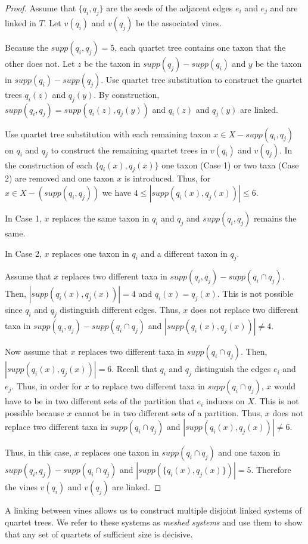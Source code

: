 \documentclass[final,3p,times]{elsarticle}
\theoremstyle{definition}
\theoremstyle{remark}
\begin{document}
\begin{proof}
Assume that $\{q_i,q_j\}$ are the seeds of the adjacent edges $e_i$ and $e_j$ and are linked in $T$. Let $v(q_i)$ and $v(q_j)$ be the associated vines. 

Because the $supp(q_i,q_j)=5$, each quartet tree contains one taxon that the other does not. Let $z$ be the taxon in $supp(q_j)-supp(q_i)$ and $y$ be the taxon in $supp(q_i)-supp(q_j)$. Use quartet tree substitution to construct the quartet trees $q_i(z)$ and $q_j(y)$. By construction, $supp(q_i,q_j)=supp(q_i(z),q_j(y))$ and $q_i(z)$ and $q_j(y)$ are linked.

Use quartet tree substitution with each remaining taxon $x \in X-supp(q_i,q_j)$ on $q_i$ and $q_j$ to construct the remaining quartet trees in $v(q_i)$ and $v(q_j)$. In the construction of each $\{q_i(x),q_j(x)\}$ one taxon (Case 1) or two taxa (Case 2) are removed and one taxon $x$ is introduced. Thus, for  $x \in X - (supp(q_i,q_j))$ we have $4 \leq |supp(q_i(x),q_j(x))| \leq 6$. 

In Case 1, $x$ replaces the same taxon in $q_i$ and $q_j$ and $supp(q_i,q_j)$ remains the same. 

In Case 2, $x$ replaces one taxon in $q_i$ and a different taxon in $q_j$. 

Assume that $x$ replaces two different taxa in $supp(q_i,q_j)-supp(q_i \cap q_j)$. Then, $|supp(q_i(x),q_j(x))|=4$ and $q_i(x)=q_j(x)$. This is not possible since $q_i$ and $q_j$ distinguish different edges. Thus, $x$ does not replace two different taxa in $supp(q_i,q_j)-supp(q_i \cap q_j)$ and $|supp(q_i(x),q_j(x))| \neq 4$.

Now assume that $x$ replaces two different taxa in $supp(q_i \cap q_j)$. Then, $|supp(q_i(x),q_j(x))|=6$. Recall that $q_i$ and $q_j$ distinguish the edges $e_i$ and $e_j$. Thus, in order for $x$ to replace two different taxa in $supp(q_i \cap q_j)$, $x$ would have to be in two different sets of the partition that $e_i$ induces on $X$. This is not possible because $x$ cannot be in two different sets of a partition. Thus, $x$ does not replace two different taxa in $supp(q_i \cap q_j)$ and $|supp(q_i(x),q_j(x))| \neq 6$. 

Thus, in this case, $x$ replaces one taxon in $supp(q_i \cap q_j)$ and one taxon in $supp(q_i,q_j)-supp(q_i \cap q_j)$ and $|supp(\{q_i(x),q_j(x)\})|=5$. Therefore the vines $v(q_i)$ and  $v(q_j)$ are linked.
\end{proof}

A linking between vines allows us to construct multiple disjoint linked systems of quartet trees. We refer to these systems as \emph{meshed systems} and use them to show that any set of quartets of sufficient size is decisive. 
\end{document}
